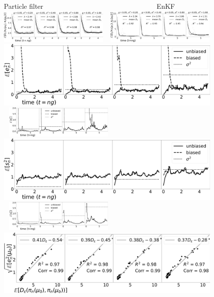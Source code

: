 \begin{figure}[t!]
\centering
Particle filter $\qquad \qquad \qquad \qquad \qquad \qquad \qquad \qquad $ EnKF\\
    \includegraphics[width=0.48\textwidth]{probing-nfs/plots/plots-bpf-effect of obs cov-rate_obs_cov_all.png} $\ \ $
    \includegraphics[width=0.48\textwidth]{probing-nfs/plots/plots-enkf-effect of ob cov-rate_all.png}\\
   \includegraphics[width=0.48\columnwidth]{probing-nfs/plots/plots-bpf-effect of obs cov-l2_obs_cov_all.png} $\ \ $
    \includegraphics[width=0.48\textwidth]{probing-nfs/plots/plots-enkf-effect of ob cov-mean_l2error_all.png}\\
   \includegraphics[width=0.48\columnwidth]{probing-nfs/plots/plots-bpf-effect of obs cov-trace_obs_cov_all.png} $\ \ $
    \includegraphics[width=0.48\textwidth]{probing-nfs/plots/plots-enkf-effect of ob cov-mean_trace_all.png}\\
   \includegraphics[width=0.48\columnwidth]{probing-nfs/plots/plots-bpf-effect of obs cov-dvl2_obs_cov_all.png} $\ \ $

\end{figure}
